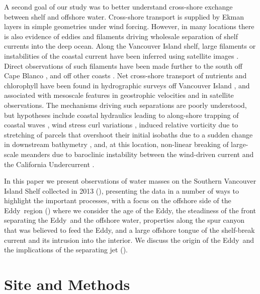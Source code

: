\documentclass[draft]{agujournal2019}
\newcommand*{\Eddy}{{\sc Eddy}}
\begin{document}
A second goal of our study was to better understand cross-shore exchange between shelf and offshore water.  Cross-shore transport is supplied by Ekman layers in simple geometries under wind forcing. However, in many locations there is also evidence of eddies and filaments driving wholesale separation of shelf currents into the deep ocean.  Along the Vancouver Island shelf, large filaments or instabilities of the coastal current have been inferred using satellite images \cite{ikedaemery84,thomsongower98}.  Direct observations of such filaments have been made further to the south off Cape Blanco \cite{barthetal00}, and off other coasts \cite{relvasbarton05}. Net cross-shore transport of nutrients and chlorophyll have been found in hydrographic surveys off Vancouver Island \cite{mackasyelland99}, and associated with mesoscale features in geostrophic velocities and in satellite observations.  The mechanisms driving such separations are poorly understood, but hypotheses include coastal hydraulics leading to along-shore trapping of coastal waves \cite{dalebarth01},  wind stress curl variations \cite{castelaobarth07}, induced relative vorticity due to stretching of parcels that overshoot their initial isobaths due to a sudden change in downstream bathymetry \cite{dasaro88}, and, at this location, non-linear breaking of large-scale meanders due to baroclinic instability between the wind-driven current and the California Undercurrent \cite{ikedaetal84, batteen97}.

In this paper we present observations of water masses on the Southern Vancouver Island Shelf collected in 2013 (), presenting the data in a number of ways to highlight the important processes, with a focus on the offshore side of the \Eddy\ region () where we consider the age of the \Eddy, the steadiness of the front separating the \Eddy\ and the offshore water, properties along the spur canyon that was believed to feed the \Eddy, and a large offshore tongue of the shelf-break current and its intrusion into the interior.  We discuss the origin of the \Eddy\ and the implications of the separating jet ().

\section{Site and Methods}
\label{sec:Site}
\end{document}
